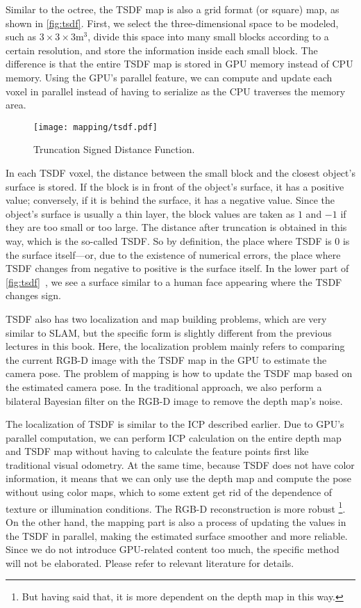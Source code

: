 Similar to the octree, the TSDF map is also a grid format (or square) map, as shown in \autoref{fig:tsdf}. First, we select the three-dimensional space to be modeled, such as $3\times3\times3 \text{m}^3$, divide this space into many small blocks according to a certain resolution, and store the information inside each small block. The difference is that the entire TSDF map is stored in GPU memory instead of CPU memory. Using the GPU's parallel feature, we can compute and update each voxel in parallel instead of having to serialize as the CPU traverses the memory area.

\begin{figure}[!t]
	\centering
	\texttt{[image: mapping/tsdf.pdf]}
	\caption{Truncation Signed Distance Function.}
	\label{fig:tsdf}
\end{figure}

In each TSDF voxel, the distance between the small block and the closest object's surface is stored. If the block is in front of the object's surface, it has a positive value; conversely, if it is behind the surface, it has a negative value. Since the object's surface is usually a thin layer, the block values are taken as $1$ and $-1$ if they are too small or too large. The distance after truncation is obtained in this way, which is the so-called TSDF. So by definition, the place where TSDF is 0 is the surface itself—or, due to the existence of numerical errors, the place where TSDF changes from negative to positive is the surface itself. In the lower part of \autoref{fig:tsdf}~, we see a surface similar to a human face appearing where the TSDF changes sign.

TSDF also has two localization and map building problems, which are very similar to SLAM, but the specific form is slightly different from the previous lectures in this book. Here, the localization problem mainly refers to comparing the current RGB-D image with the TSDF map in the GPU to estimate the camera pose. The problem of mapping is how to update the TSDF map based on the estimated camera pose. In the traditional approach, we also perform a bilateral Bayesian filter on the RGB-D image to remove the depth map's noise.

The localization of TSDF is similar to the ICP described earlier. Due to GPU's parallel computation, we can perform ICP calculation on the entire depth map and TSDF map without having to calculate the feature points first like traditional visual odometry. At the same time, because TSDF does not have color information, it means that we can only use the depth map and compute the pose without using color maps, which to some extent get rid of the dependence of texture or illumination conditions. The RGB-D reconstruction is more robust \footnote{But having said that, it is more dependent on the depth map in this way. }. On the other hand, the mapping part is also a process of updating the values in the TSDF in parallel, making the estimated surface smoother and more reliable. Since we do not introduce GPU-related content too much, the specific method will not be elaborated. Please refer to relevant literature for details.

